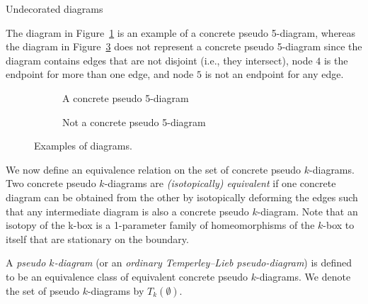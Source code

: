 \begin{section}{Undecorated diagrams}
\begin{example}\label{ex:pseudo diagram}
\rm The diagram in Figure~\ref{psuedo} is an example of a concrete pseudo 5-diagram, whereas the diagram in Figure~\ref{fig:notp} does not represent a concrete pseudo 5-diagram since the diagram contains edges that are not disjoint (i.e., they intersect), node $4$ is the endpoint for more than one edge, and node $5$ is not an endpoint for any edge.
\end{example}

\begin{figure}[!h]
\centering
\begin{subfigure}[b]{0.4\textwidth}
\centering
{}
\caption{A concrete pseudo 5-diagram}
\label{psuedo}
\end{subfigure}
\quad
\begin{subfigure}[b]{0.4\textwidth}
\centering
{}
\caption{Not a concrete pseudo 5-diagram}
\label{fig:notp}
\end{subfigure}
\caption{Examples of diagrams.}
\end{figure}

 We now define an equivalence relation on the set of concrete pseudo $k$-diagrams. Two concrete pseudo $k$-diagrams are \emph{(isotopically) equivalent} if one concrete diagram can be obtained from the other by isotopically deforming the edges such that any intermediate diagram is also a concrete pseudo $k$-diagram. Note that an isotopy of the k-box is a 1-parameter family of homeomorphisms of the $k$-box to itself that are stationary on the boundary.
\begin{definition}
A \emph{pseudo $k$-diagram} (or an \emph{ordinary Temperley--Lieb pseudo-diagram}) is defined to be an equivalence class of equivalent concrete pseudo $k$-diagrams.  We denote the set of pseudo $k$-diagrams by $T_{k}(\emptyset)$.
\end{definition}


\end{section}
